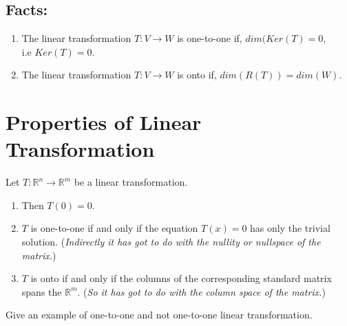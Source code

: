 \documentclass[aima104_lecturenotes_ku.tex]{subfiles}
\begin{document}
\subsection{Facts:}
\begin{enumerate}
\item The linear transformation $T: V \to W$ is one-to-one if, $dim(Ker(T) = 0$, \\
  i.e $Ker(T) = {0}$.

\item The linear transformation $T: V \to W$ is onto if, $dim(R(T)) = dim(W)$.
\end{enumerate}

\section{Properties of Linear Transformation}
Let $T: \mathbb{R}^n \to \mathbb{R}^m$ be a linear transformation.
\begin{enumerate}
\item Then $T(0)=0$.
\item $T$ is one-to-one if and only if the equation $T(x)=0$ has only the trivial solution. (\textit{Indirectly it has got to do with the nullity or nullspace of the matrix.})
\item $T$ is onto if and only if the columns of the corresponding standard matrix spans the $\mathbb{R}^m$. (\textit{So it has got to do with the column space of the matrix.})
\end{enumerate}
Give an example of one-to-one and not one-to-one linear transformation.
\end{document}
